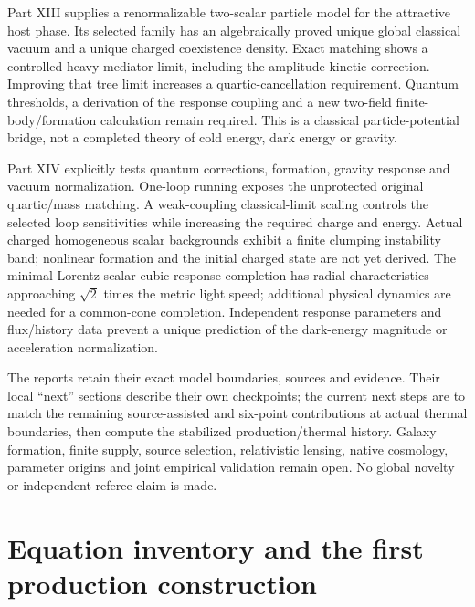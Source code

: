 \documentclass[11pt]{article}
\begin{document}
Part XIII supplies a renormalizable two-scalar particle model for the
attractive host phase. Its selected family has an algebraically proved
unique global classical vacuum and a unique charged coexistence density.
Exact matching shows a controlled heavy-mediator limit, including the
amplitude kinetic correction. Improving that tree limit increases a
quartic-cancellation requirement. Quantum thresholds, a derivation of the
response coupling and a new two-field finite-body/formation calculation
remain required. This is a classical particle-potential bridge, not a
completed theory of cold energy, dark energy or gravity.

Part XIV explicitly tests quantum corrections, formation, gravity response
and vacuum normalization. One-loop running exposes the unprotected original
quartic/mass matching. A weak-coupling classical-limit scaling controls the
selected loop sensitivities while increasing the required charge and energy.
Actual charged homogeneous scalar backgrounds exhibit a finite clumping
instability band; nonlinear formation and the initial charged state are
not yet derived. The minimal Lorentz scalar cubic-response completion has
radial characteristics approaching $\sqrt2$ times the metric light speed;
additional physical dynamics are needed for a common-cone completion.
Independent response parameters and flux/history data prevent a unique
prediction of the dark-energy magnitude or acceleration normalization.

The reports retain their exact model boundaries, sources and evidence.
Their local ``next'' sections describe their own checkpoints; the current
next steps are to match the remaining
source-assisted and six-point contributions at actual thermal boundaries,
then compute the stabilized production/thermal history. Galaxy
formation, finite supply, source selection, relativistic lensing, native
cosmology, parameter origins and joint empirical validation remain open.
No global novelty or independent-referee claim is made.

\tableofcontents
\clearpage

\part{Equation inventory and the first production construction}

\begin{abstract}
The physical theory remains open. This report separates vacuum stress,
mass-carrying excitations, and collective response, and records the equations
needed to connect them. Three routes are executed: a charge-preserving Higgs
production extension, an exact cold--vacuum exchange consistency relation,
and an exterior-mass lensing test. The simplest portal extension encounters
mass-potential and kinetic-evolution obstructions at the adopted benchmark;
a source-quartic extension repairs the global classical potential exactly;
the exchange relation supplies a falsifiable joint constraint; positive
spherical exterior mass cannot increase interior excess tangential shear.
These are conditional reductions and applications of known mechanisms,
not a particle discovery, a Standard Model derivation, or global novelty claims.
\end{abstract}
\end{document}
